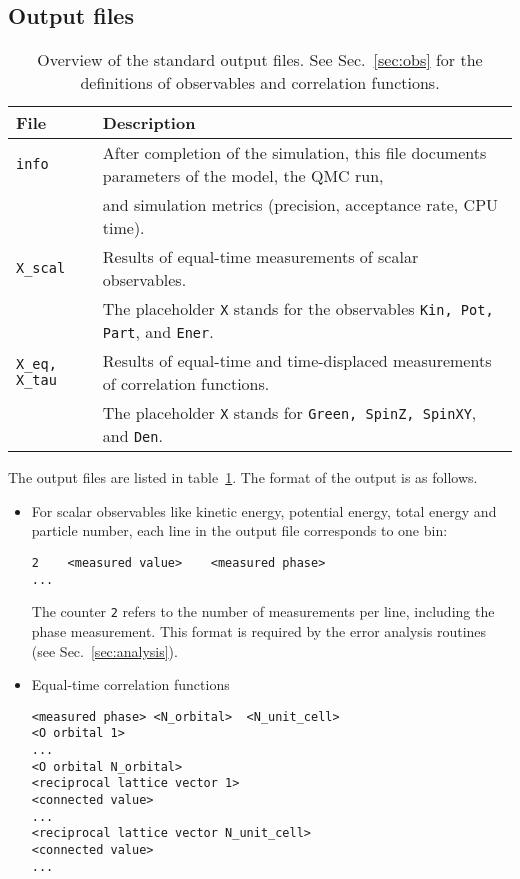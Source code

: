 \subsection{Output files} \label{sec:output}
%
\begin{table}[h]
   \begin{tabular}{l l}
   File & Description \\\hline
   \texttt{info} & After completion of the simulation, this file documents parameters of the  model, the QMC run, \\
   & and simulation metrics (precision, acceptance rate, CPU time).\\
   \texttt{X\_scal} & Results of equal-time measurements of scalar observables. \\
   & The placeholder \texttt{X} stands for the observables \texttt{Kin, Pot, Part}, and \texttt{Ener}. \\
   \texttt{X\_eq, X\_tau} & Results of equal-time and time-displaced measurements of correlation functions. \\
   & The placeholder \texttt{X} stands for \texttt{Green, SpinZ, SpinXY}, and \texttt{Den}. \\   
   \end{tabular}
   \caption{Overview of the standard output files. 
  See Sec.~\ref{sec:obs} for the definitions of observables and correlation functions. \label{table:output}}
\end{table}
%
The output files are listed in table~\ref{table:output}. The format of the output is as follows.
\begin{itemize}
\item For scalar observables like kinetic energy, potential energy, total energy and particle number, 
each line in the output file corresponds to one bin:
\begin{verbatim}
2    <measured value>    <measured phase>
...
\end{verbatim}
The counter \texttt{2} refers to the number of measurements per line, including the phase measurement. 
This format is required by the error analysis routines (see Sec.~\ref{sec:analysis}).

\item Equal-time correlation functions
\begin{verbatim}
<measured phase> <N_orbital>  <N_unit_cell>
<O orbital 1>
...
<O orbital N_orbital>
<reciprocal lattice vector 1>
<connected value>
...
<reciprocal lattice vector N_unit_cell>
<connected value>
...
\end{verbatim}

\end{itemize}

